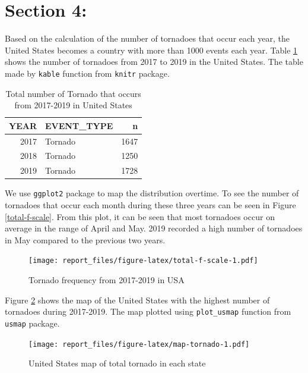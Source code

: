 \documentclass[
]{article}
\begin{document}
\clearpage

\hypertarget{section-4}{%
\section{Section 4:}\label{section-4}}

Based on the calculation of the number of tornadoes that occur each year, the United States becomes a country with more than 1000 events each year. \citet{USTornad80} Table \ref{tab:table-tornado} shows the number of tornadoes from 2017 to 2019 in the United States.
The table made by \texttt{kable} function from \texttt{knitr} package. \citet{knitr}

\begin{table}[!h]

\caption{\label{tab:table-tornado}Total number of Tornado that occurs from 2017-2019 in United States}
\centering
\begin{tabular}[t]{r|l|r}
\hline
YEAR & EVENT\_TYPE & n\\
\hline
2017 & Tornado & 1647\\
\hline
2018 & Tornado & 1250\\
\hline
2019 & Tornado & 1728\\
\hline
\end{tabular}
\end{table}

We use \texttt{ggplot2} package to map the distribution overtime. \citet{ggplot2} To see the number of tornadoes that occur each month during these three years can be seen in Figure \ref{total-f-scale}. From this plot, it can be seen that most tornadoes occur on average in the range of April and May. 2019 recorded a high number of tornadoes in May compared to the previous two years.

\begin{figure}
\centering
\texttt{[image: report\_files/figure-latex/total-f-scale-1.pdf]}
\caption{\label{fig:total-f-scale}Tornado frequency from 2017-2019 in USA}
\end{figure}

\clearpage

Figure \ref{fig:map-tornado} shows the map of the United States with the highest number of tornadoes during 2017-2019. The map plotted using \texttt{plot\_usmap} function from \texttt{usmap} package. \citet{usmap}

\begin{figure}
\centering
\texttt{[image: report\_files/figure-latex/map-tornado-1.pdf]}
\caption{\label{fig:map-tornado}United States map of total tornado in each state}
\end{figure}
\end{document}
